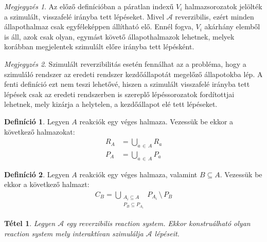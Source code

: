 \documentclass[12pt]{article}
\theoremstyle{definition}
\newtheorem*{definition*}{Definíció}
\theoremstyle{remark}
\newtheorem*{remark*}{Megjegyzés}
\theoremstyle{plain}
\newtheorem*{theorem*}{Tétel}
\theoremstyle{plain}
\begin{document}
    \begin{remark*}
        Az előző definícióban a páratlan indexű $V_{i}$ halmazsorozatok jelölték a szimulált, visszafelé irányba tett lépéseket. Mivel $\mathscr{A}$ reverzibilis, ezért minden állapothalmaz csak egyféleképpen állítható elő. Ennél fogva, $V_{i}$ akárhány elemből is áll, azok csak olyan, egymást követő állapothalmazok lehetnek, melyek korábban megjelentek szimulált előre irányba tett lépésként.
    \end{remark*}

    \begin{remark*}
        Szimulált reverzibilitás esetén fennálhat az a probléma, hogy a szimuláló rendszer az eredeti rendszer kezdőállapotát megelőző állapotokba lép. A fenti definíció ezt nem teszi lehetővé, hiszen a szimulált visszafelé irányba tett lépések csak az eredeti rendszerben is szereplő lépéssorozatok fordítottjai lehetnek, mely kizárja a helytelen, a kezdőállapot elé tett lépéseket.
    \end{remark*}

    \begin{definition*}
        Legyen $A$ reakciók egy véges halmaza. Vezessük be ekkor a következő halmazokat:
        \begin{align*}
            R_{A} &= \bigcup\limits_{a \,\in\, A} R_{a} \\
            P_{A} &= \bigcup\limits_{a \,\in\, A} P_{a}
        \end{align*}
    \end{definition*}

    \begin{definition*}
        Legyen $A$ reakciók egy véges halmaza, valamint $B \subseteq A$. Vezessük be ekkor a következő halmazt:
        \begin{align*}
            C_{B} = \bigcup\limits_{\substack{A_{i} \subseteq A \\ P_{B} \subseteq P_{A_{i}}}} P_{A_{i}} \,\setminus\, P_{B}
        \end{align*}
    \end{definition*}

    \begin{theorem*}
        Legyen $\mathscr{A}$ egy reverzibilis \textit{reaction system}. Ekkor konstruálható olyan \textit{reaction system} mely interaktívan szimulálja $\mathscr{A}$ lépéseit.
    \end{theorem*}
\end{document}
